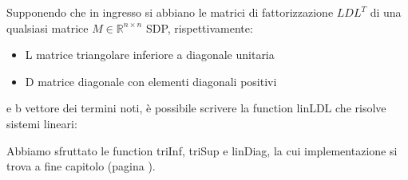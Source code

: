 \begin{flushleft}
Supponendo che in ingresso si abbiano le matrici di fattorizzazione $LDL^T$ di una qualsiasi matrice $M \in \mathbb{R}^{n\times n}$ SDP, rispettivamente:
\begin{itemize}
    \item L matrice triangolare inferiore a diagonale unitaria
    \item D matrice diagonale con elementi diagonali positivi
\end{itemize}
e b vettore dei termini noti, è possibile scrivere la function linLDL che risolve sistemi lineari:

Abbiamo sfruttato le function triInf, triSup e linDiag, la cui implementazione si trova a fine capitolo (pagina \pageref{functcap3}).
\end{flushleft}